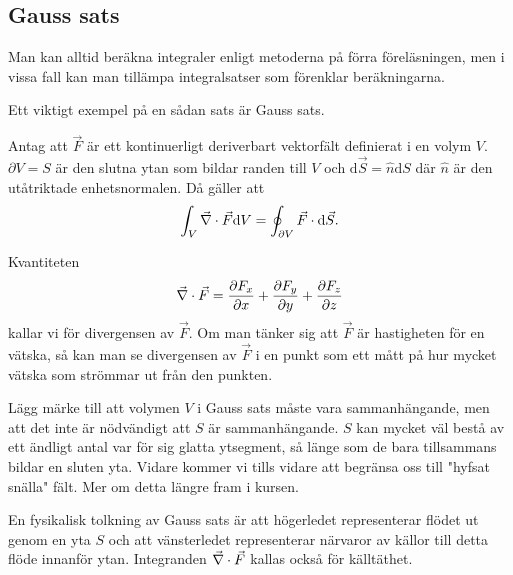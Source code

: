 \documentclass[%
oneside,                 %
final,                   %
10pt]{article}
\newenvironment{summary_mdfboxadmon}[1][]{
\begin{summary_mdfboxmdframed}[frametitle=#1]
}
{
\end{summary_mdfboxmdframed}
}
\begin{document}
\subsection*{Gauss sats}

Man kan alltid beräkna integraler enligt metoderna på förra föreläsningen, men i vissa fall kan man tillämpa integralsatser som förenklar beräkningarna.

Ett viktigt exempel på en sådan sats är Gauss sats.  


\begin{summary_mdfboxadmon}[Sats:]
Antag att $\vec{F}$ är ett kontinuerligt deriverbart vektorfält definierat i en volym $V$. $\partial V = S$ är den slutna ytan som bildar randen till $V$ och $\mbox{d}\vec{S} = \hat{n} \mbox{d}S$ där $\hat{n}$ är den utåtriktade enhetsnormalen. Då gäller att
\begin{equation}
  \int_V \vec{\nabla} \cdot \vec{F} \mbox{d}V = \oint_{\partial V} \vec{F} \cdot \mbox{d} \vec{S}.
\end{equation}
\end{summary_mdfboxadmon} %



Kvantiteten
\begin{equation}
\vec{\nabla}  \cdot \vec{F} = \frac{\partial F_x}{\partial x} +
\frac{\partial F_y}{\partial y} + \frac{\partial F_z}{\partial z}
\end{equation}
kallar vi för divergensen av $\vec{F}$. Om man tänker sig att $\vec{F}$ är hastigheten för en vätska, så kan man se divergensen av $\vec{F}$ i en punkt som ett mått på hur mycket vätska som strömmar ut från den punkten.

Lägg märke till att volymen $V$ i Gauss sats måste vara sammanhängande, men att det inte är nödvändigt att $S$ är sammanhängande.  $S$ kan mycket väl bestå av ett ändligt antal var för sig glatta ytsegment, så länge som de bara tillsammans bildar en sluten yta. Vidare kommer vi tills vidare att begränsa oss till "hyfsat snälla" fält. Mer om detta längre fram i kursen.

En fysikalisk tolkning av Gauss sats är att högerledet representerar flödet ut genom en yta $S$ och att vänsterledet representerar närvaror av källor till detta flöde innanför ytan. Integranden $\vec{\nabla} \cdot \vec{F}$ kallas också för källtäthet.
\end{document}
